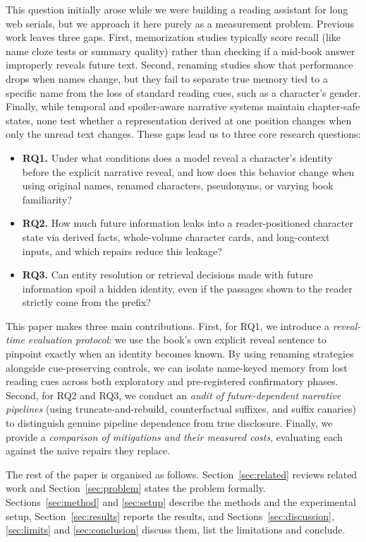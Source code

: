 \documentclass[sn-mathphys]{sn-jnl}%
\theoremstyle{thmstyleone}%
\theoremstyle{thmstyletwo}%
\theoremstyle{thmstylethree}%
\begin{document}
This question initially arose while we were building a reading assistant for long web serials, but we approach it here purely as a measurement problem. Previous work leaves three gaps. First, memorization studies typically score recall (like name cloze tests or summary quality) rather than checking if a mid-book answer improperly reveals future text. Second, renaming studies show that performance drops when names change, but they fail to separate true memory tied to a specific name from the loss of standard reading cues, such as a character's gender. Finally, while temporal and spoiler-aware narrative systems maintain chapter-safe states, none test whether a representation derived at one position changes when only the unread text changes. These gaps lead us to three core research questions:
\begin{itemize}
\item \textbf{RQ1.} Under what conditions does a model reveal a character's identity before the explicit narrative reveal, and how does this behavior change when using original names, renamed characters, pseudonyms, or varying book familiarity?
\item \textbf{RQ2.} How much future information leaks into a reader-positioned character state via derived facts, whole-volume character cards, and long-context inputs, and which repairs reduce this leakage?
\item \textbf{RQ3.} Can entity resolution or retrieval decisions made with future information spoil a hidden identity, even if the passages shown to the reader strictly come from the prefix?
\end{itemize}

This paper makes three main contributions. First, for RQ1, we introduce a \emph{reveal-time evaluation protocol}: we use the book's own explicit reveal sentence to pinpoint exactly when an identity becomes known. By using renaming strategies alongside cue-preserving controls, we can isolate name-keyed memory from lost reading cues across both exploratory and pre-registered confirmatory phases. Second, for RQ2 and RQ3, we conduct an \emph{audit of future-dependent narrative pipelines} (using truncate-and-rebuild, counterfactual suffixes, and suffix canaries) to distinguish genuine pipeline dependence from true disclosure. Finally, we provide a \emph{comparison of mitigations and their measured costs}, evaluating each against the naive repairs they replace.

The rest of the paper is organised as follows. Section~\ref{sec:related} reviews related work and Section~\ref{sec:problem} states the problem formally. Sections~\ref{sec:method} and \ref{sec:setup} describe the methods and the experimental setup, Section~\ref{sec:results} reports the results, and Sections~\ref{sec:discussion}, \ref{sec:limits} and \ref{sec:conclusion} discuss them, list the limitations and conclude.
\end{document}
